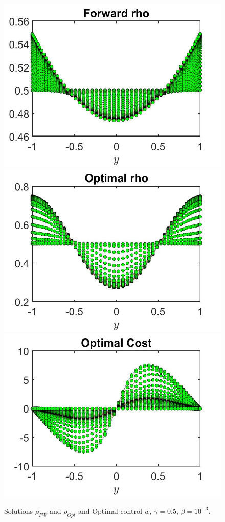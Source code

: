 \documentclass[11pt, a4paper]{article}
\theoremstyle{definition}
\begin{document}
\begin{figure}[h]
	\includegraphics[scale=0.3]{rhoFW0305a.jpg}
	\includegraphics[scale=0.3]{rhoOpt0305a.jpg}
	\includegraphics[scale=0.3]{wOpt0305a.jpg}
	\caption{Solutions $\rho_{FW}$ and $\rho_{Opt}$ and Optimal control $w$, $\gamma = 0.5$, $\beta = 10^{-3}$.}
	\label{rho00305a}
\end{figure}
\end{document}
